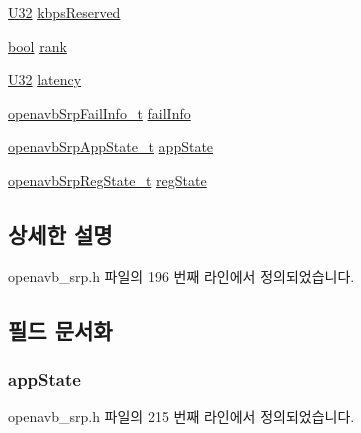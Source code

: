 \begin{DoxyCompactItemize}
\item 
\hyperlink{openavb__types__base__pub_8h_a696390429f2f3b644bde8d0322a24124}{U32} \hyperlink{structopenavb_srp_strm_a0834846e1536a8edd920e77536a9acaf}{kbps\+Reserved}
\item 
\hyperlink{avb__gptp_8h_af6a258d8f3ee5206d682d799316314b1}{bool} \hyperlink{structopenavb_srp_strm_a6942178950dac6f17c094fb856a3c6eb}{rank}
\item 
\hyperlink{openavb__types__base__pub_8h_a696390429f2f3b644bde8d0322a24124}{U32} \hyperlink{structopenavb_srp_strm_ae16309c230017ae952e8a54441556efc}{latency}
\item 
\hyperlink{openavb__srp__api_8h_a09c6c517b461f3367ff591f42916d957}{openavb\+Srp\+Fail\+Info\+\_\+t} \hyperlink{structopenavb_srp_strm_ababc5c648c7af6384d778794cf8a1780}{fail\+Info}
\item 
\hyperlink{openavb__srp_8h_ab2fcda7001e3263ee3226ab3212118fa}{openavb\+Srp\+App\+State\+\_\+t} \hyperlink{structopenavb_srp_strm_a6662c0affddb4204101e30c7525c2bda}{app\+State}
\item 
\hyperlink{openavb__srp_8h_a41887f2e72921b3029866fd50fb9f7bd}{openavb\+Srp\+Reg\+State\+\_\+t} \hyperlink{structopenavb_srp_strm_aa761b2a55e2cd2b588f6660f667b7682}{reg\+State}
\end{DoxyCompactItemize}


\subsection{상세한 설명}


openavb\+\_\+srp.\+h 파일의 196 번째 라인에서 정의되었습니다.



\subsection{필드 문서화}
\subsubsection[{\texorpdfstring{app\+State}{appState}}]{ app\+State}\hypertarget{structopenavb_srp_strm_a6662c0affddb4204101e30c7525c2bda}{}\label{structopenavb_srp_strm_a6662c0affddb4204101e30c7525c2bda}


openavb\+\_\+srp.\+h 파일의 215 번째 라인에서 정의되었습니다.

